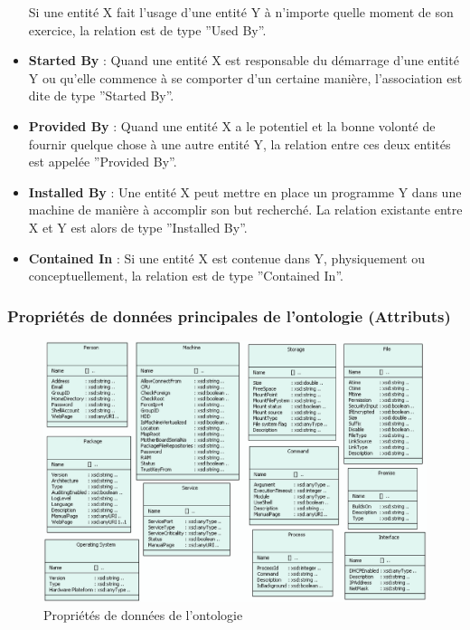 \begin{itemize}
	  Si une entité X fait l'usage d'une entité Y à n'importe quelle moment
	  de son exercice, la relation est de type ''Used By''.
  \item \textbf{Started By} : 
	  Quand une entité X est responsable du démarrage d'une entité Y ou
	  qu'elle commence à se comporter d'un certaine manière, l'association
	  est dite de type ''Started By''.
  \item \textbf{Provided By} : 
	  Quand une entité X a le potentiel et la bonne volonté de fournir
	  quelque chose à une autre entité Y, la relation entre ces deux entités
	  est appelée ''Provided By''.
  \item \textbf{Installed By} : 
	  Une entité X peut mettre en place un programme Y dans une machine de
	  manière à accomplir son but recherché. La relation existante entre X
	  et Y est alors de type ''Installed By''.
  \item \textbf{Contained In} :
	  Si une entité X est contenue dans Y, physiquement ou conceptuellement,
	  la relation est de type ''Contained In''.
\end{itemize}

\subsubsection{Propriétés de données principales de l'ontologie (Attributs)}

\begin{figure}[h]
    \centering
    \includegraphics[width=.8\textwidth]{img/ontology_attributes}
    \caption{Propriétés de données de l'ontologie}
    \label{fig:ontology_entities}
\end{figure}

